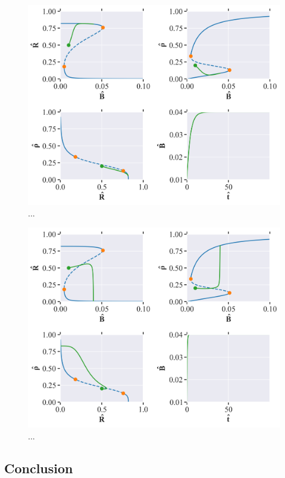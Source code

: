 \begin{figure}[H]
    \centering
    \includegraphics[width= \textwidth]{figures/cb_rtip_R(0)=0.5_rho(0)=0.2_B(0)_0.01_eps=0.01_Bmax=0.04.png}
    \caption{...}
    \label{fig:cell_biology_R_tipping_small}
\end{figure}

\begin{figure}[H]
    \centering
    \includegraphics[width= \textwidth]{figures/cb_rtip_R(0)=0.5_rho(0)=0.2_B(0)_0.01_eps=0.1_Bmax=0.04.png}
    \caption{...}
    \label{fig:cell_biology_R_tipping_big}
\end{figure}


\subsection{Conclusion}
